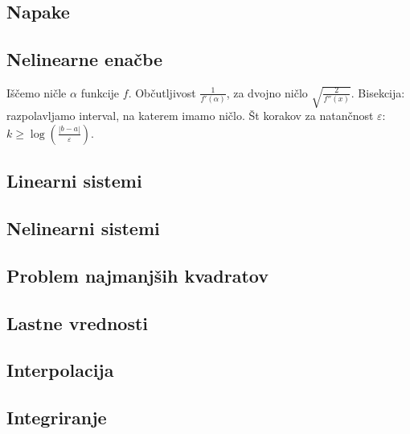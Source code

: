 \documentclass[a4paper,10pt]{article}
\title{\mytitle}
\author{Jure Slak}
\date{\today}
\theoremstyle{definition}
\begin{document}
\subsection*{Napake}
\subsection*{Nelinearne enačbe}
Iščemo ničle $\alpha$ funkcije $f$. Občutljivost $\frac{1}{f'(\alpha)}$, za
dvojno ničlo $\sqrt{\frac{2}{f''(x)}}$.
Bisekcija: razpolavljamo interval, na katerem imamo ničlo. Št korakov za
natančnost $\varepsilon$: $k \geq \log\left(\frac{|b-a|}{\varepsilon}\right)$.
\subsection*{Linearni sistemi}
\subsection*{Nelinearni sistemi}
\subsection*{Problem najmanjših kvadratov}
\subsection*{Lastne vrednosti}
\subsection*{Interpolacija}
\subsection*{Integriranje}
\end{document}
